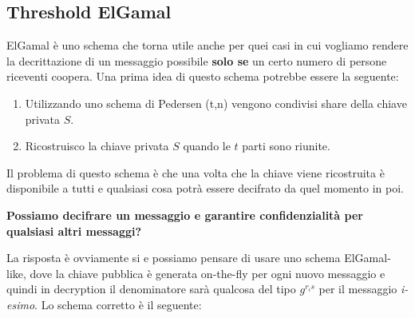 \subsection{Threshold ElGamal}
ElGamal è uno schema che torna utile anche per quei casi in cui vogliamo rendere la decrittazione di un messaggio possibile \textbf{solo se} un certo numero di persone riceventi coopera. Una prima idea di questo schema potrebbe essere la seguente:
\begin{enumerate}
    \item Utilizzando uno schema di Pedersen (t,n) vengono condivisi share della chiave privata $S$.
    \item Ricostruisco la chiave privata $S$ quando le $t$ parti sono riunite.
\end{enumerate}
Il problema di questo schema è che una volta che la chiave viene ricostruita è disponibile a tutti e qualsiasi cosa potrà essere decifrato da quel momento in poi.
\begin{problem}
\textbf{Possiamo decifrare un messaggio e garantire confidenzialità per qualsiasi altri messaggi?}
\end{problem}
La risposta è ovviamente si e possiamo pensare di usare uno schema ElGamal-like, dove la chiave pubblica è generata on-the-fly per ogni nuovo messaggio e quindi in decryption il denominatore sarà qualcosa del tipo $g^{r_is}$ per il messaggio \textit{i-esimo}. Lo schema corretto è il seguente:
